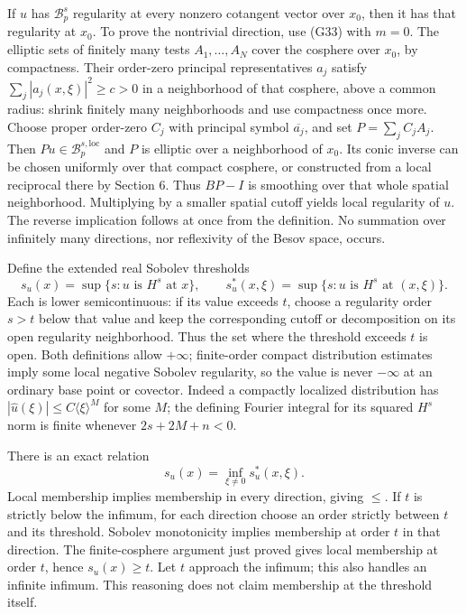 \documentclass[
  11pt,
]{article}
\begin{document}
If \(u\) has \(\mathcal B^s_p\) regularity at every nonzero cotangent
vector over \(x_0\), then it has that regularity at \(x_0\). To prove
the nontrivial direction, use (G33) with \(m=0\). The elliptic sets of
finitely many tests \(A_1,\ldots,A_N\) cover the cosphere over \(x_0\),
by compactness. Their order-zero principal representatives \(a_j\)
satisfy \(\sum_j|a_j(x,\xi)|^2\geq c>0\) in a neighborhood of that
cosphere, above a common radius: shrink finitely many neighborhoods and
use compactness once more. Choose proper order-zero \(C_j\) with
principal symbol \(\overline{a_j}\), and set \(P=\sum_j C_jA_j\). Then
\(Pu\in\mathcal B^{s,\mathrm{loc}}_p\) and \(P\) is elliptic over a
neighborhood of \(x_0\). Its conic inverse can be chosen uniformly over
that compact cosphere, or constructed from a local reciprocal there by
Section 6. Thus \(BP-I\) is smoothing over that whole spatial
neighborhood. Multiplying by a smaller spatial cutoff yields local
regularity of \(u\). The reverse implication follows at once from the
definition. No summation over infinitely many directions, nor
reflexivity of the Besov space, occurs.

Define the extended real Sobolev thresholds \[
s_u(x)=\sup\{s:u\text{ is }H^s\text{ at }x\},\qquad
s_u^*(x,\xi)=\sup\{s:u\text{ is }H^s\text{ at }(x,\xi)\}.
\tag{G35}
\] Each is lower semicontinuous: if its value exceeds \(t\), choose a
regularity order \(s>t\) below that value and keep the corresponding
cutoff or decomposition on its open regularity neighborhood. Thus the
set where the threshold exceeds \(t\) is open. Both definitions allow
\(+\infty\); finite-order compact distribution estimates imply some
local negative Sobolev regularity, so the value is never \(-\infty\) at
an ordinary base point or covector. Indeed a compactly localized
distribution has \(|\widehat u(\xi)|\leq C\langle\xi\rangle^M\) for some
\(M\); the defining Fourier integral for its squared \(H^s\) norm is
finite whenever \(2s+2M+n<0\).

There is an exact relation \[
s_u(x)=\inf_{\xi\ne0}s_u^*(x,\xi).
\tag{G36}
\] Local membership implies membership in every direction, giving
\(\leq\). If \(t\) is strictly below the infimum, for each direction
choose an order strictly between \(t\) and its threshold. Sobolev
monotonicity implies membership at order \(t\) in that direction. The
finite-cosphere argument just proved gives local membership at order
\(t\), hence \(s_u(x)\geq t\). Let \(t\) approach the infimum; this also
handles an infinite infimum. This reasoning does not claim membership at
the threshold itself.
\end{document}
